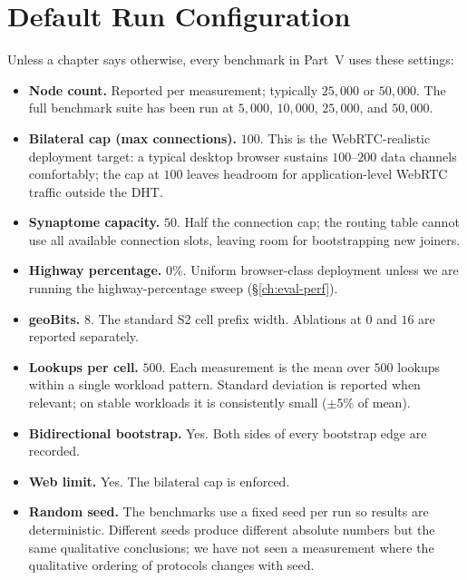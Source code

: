 \documentclass[twoside,nobib]{tufte-book}
\begin{document}
\section{Default Run Configuration}

Unless a chapter says otherwise, every benchmark in
Part~V uses these settings:

\begin{itemize}\setlength\itemsep{0.15em}
  \item \textbf{Node count.} Reported per measurement; typically
    $25{,}000$ or $50{,}000$. The full benchmark suite has been
    run at $5{,}000$, $10{,}000$, $25{,}000$, and $50{,}000$.
  \item \textbf{Bilateral cap (max connections).} $100$. This is
    the WebRTC-realistic deployment target: a typical desktop
    browser sustains $100$--$200$ data channels comfortably; the
    cap at $100$ leaves headroom for application-level WebRTC
    traffic outside the DHT.
  \item \textbf{Synaptome capacity.} $50$. Half the connection
    cap; the routing table cannot use all available connection
    slots, leaving room for bootstrapping new joiners.
  \item \textbf{Highway percentage.} $0\%$. Uniform browser-class
    deployment unless we are running the highway-percentage
    sweep (\S\ref{ch:eval-perf}).
  \item \textbf{geoBits.} $8$. The standard S2 cell prefix
    width. Ablations at $0$ and $16$ are reported separately.
  \item \textbf{Lookups per cell.} $500$. Each measurement is the
    mean over $500$ lookups within a single workload pattern.
    Standard deviation is reported when relevant; on stable
    workloads it is consistently small ($\pm 5\%$ of mean).
  \item \textbf{Bidirectional bootstrap.} Yes. Both sides of
    every bootstrap edge are recorded.
  \item \textbf{Web limit.} Yes. The bilateral cap is enforced.
  \item \textbf{Random seed.} The benchmarks use a fixed seed
    per run so results are deterministic. Different seeds produce
    different absolute numbers but the same qualitative
    conclusions; we have not seen a measurement where the
    qualitative ordering of protocols changes with seed.
\end{itemize}
\end{document}
